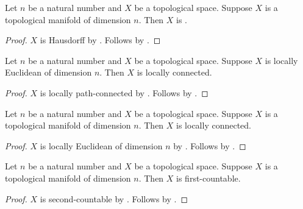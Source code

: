 \begin{theorem}\label{topological_manifold_is_teeone}
    Let $n$ be a natural number and $X$ be a topological space.
    Suppose $X$ is a topological manifold of dimension $n$.
    Then $X$ is \teeone.
\end{theorem}
\begin{proof}
    $X$ is Hausdorff by .
    Follows by .
\end{proof}

\begin{theorem}\label{locally_euclidean_is_locally_connected}
    Let $n$ be a natural number and $X$ be a topological space.
    Suppose $X$ is locally Euclidean of dimension $n$.
    Then $X$ is locally connected.
\end{theorem}
\begin{proof}
    $X$ is locally path-connected by .
    Follows by .
\end{proof}

\begin{theorem}\label{topological_manifold_is_locally_connected}
    Let $n$ be a natural number and $X$ be a topological space.
    Suppose $X$ is a topological manifold of dimension $n$.
    Then $X$ is locally connected.
\end{theorem}
\begin{proof}
    $X$ is locally Euclidean of dimension $n$ by .
    Follows by .
\end{proof}

\begin{theorem}\label{topological_manifold_is_first_countable}
    Let $n$ be a natural number and $X$ be a topological space.
    Suppose $X$ is a topological manifold of dimension $n$.
    Then $X$ is first-countable.
\end{theorem}
\begin{proof}
    $X$ is second-countable by .
    Follows by .
\end{proof}

